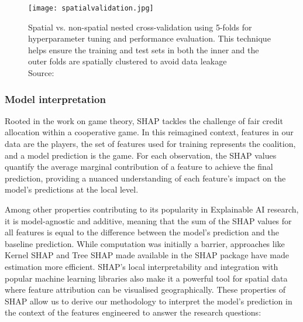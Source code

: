 \begin{figure}[!ht]
    \centering
    \texttt{[image: spatialvalidation.jpg]}
    \captionsetup{justification=centering}
    \caption{Spatial vs. non-spatial nested cross-validation using 5-folds for hyperparameter tuning and performance evaluation. This technique helps ensure the training and test sets in both the inner and the outer folds are spatially clustered to avoid data leakage\\ Source: \citet{schratzPerformanceEvaluationHyperparameter2018}}
    \label{fig:spatialnested}
\end{figure}

\subsubsection*{Model interpretation}

Rooted in the work on game theory, SHAP tackles the challenge of fair credit allocation within a cooperative game. In this reimagined context, features in our data are the players, the set of features used for training represents the coalition, and a model prediction is the game. For each observation, the SHAP values quantify the average marginal contribution of a feature to achieve the final prediction, providing a nuanced understanding of each feature's impact on the model's predictions at the local level.

Among other properties contributing to its popularity in Explainable AI research, it is model-agnostic and additive, meaning that the sum of the SHAP values for all features is equal to the difference between the model's prediction and the baseline prediction. While computation was initially a barrier, approaches like Kernel SHAP and Tree SHAP made available in the SHAP package have made estimation more efficient. SHAP's local interpretability and integration with popular machine learning libraries also make it a powerful tool for spatial data where feature attribution can be visualised geographically. These properties of SHAP allow us to derive our methodology to interpret the model's prediction in the context of the features engineered to answer the research questions:

